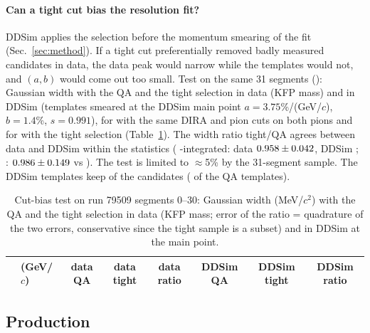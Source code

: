 \paragraph{Can a tight cut bias the resolution fit?} DDSim applies the selection before the momentum smearing of the fit
(Sec.~\ref{sec:method}). If a tight cut preferentially removed badly measured candidates in data, the data peak would narrow
while the templates would not, and $(a,b)$ would come out too small. Test on the same 31 segments ():
Gaussian width with the QA and the tight selection in data (KFP mass) and in DDSim (templates smeared at the DDSim main point
$a=3.75$\%/(GeV/$c$), $b=1.4$\%, $s=0.991$), for \Ks{} with the same DIRA and pion cuts on both pions and for \La{} with the tight
selection (Table~\ref{tab:tightbias}). The width ratio tight/QA agrees between data and DDSim within the statistics (\Ks{}
\pt-integrated: data $0.958\pm0.042$, DDSim \BiasKsRatS; \La: $0.986\pm0.149$ vs \BiasLaRatS). The test
is limited to $\approx$5\% by the 31-segment sample. The DDSim \La{} templates keep \TmplLaTight{} of the candidates
(\TmplLaTightFrac{} of the QA templates).

\begin{table}[H]
\centering\footnotesize
\caption{Cut-bias test on run 79509 segments 0--30: Gaussian width (MeV/$c^2$) with the QA and the tight selection in data
(KFP mass; error of the ratio = quadrature of the two errors, conservative since the tight sample is a subset) and in DDSim at
the main point.}
\label{tab:tightbias}
\begin{tabular}{llcccccc}
\toprule
 & \pt{} (GeV/$c$) & data QA & data tight & data ratio & DDSim QA & DDSim tight & DDSim ratio \\
\midrule

\bottomrule
\end{tabular}
\end{table}

\subsection{Production}

